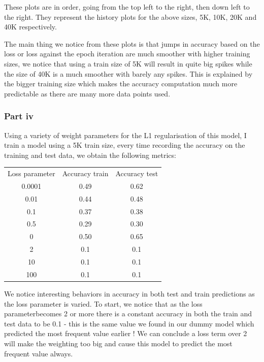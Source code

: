 \documentclass[10pt]{article}
\begin{document}
These plots are in order, going from the top left to the right, then down left to the right.
They represent the history plots for the above sizes, 5K, 10K, 20K and 40K respectively.

The main thing we notice from these plots is that jumps in accuracy based on the loss
or loss against the epoch iteration are much smoother with higher training sizes, we notice
that using a train size of 5K will result in quite big spikes while the size of 40K
is a much smoother with barely any spikes. This is explained by the bigger
training size which makes the accuracy computation much more predictable as there are many more data points used. 

\subsubsection*{Part iv}
Using a variety of weight parameters for the L1 regularisation of this model, I train a model using a 5K train size, every time
recording the accuracy on the training and test data, we obtain the following metrics:

\vspace{5mm} %
\begin{center} \begin{tabular}[h]{ccc}
    Loss parameter & Accuracy train & Accuracy test  \\
    0.0001 & 0.49           & 0.62            \\
    0.01   & 0.44           & 0.48            \\
    0.1    & 0.37           & 0.38            \\   
    0.5    & 0.29           & 0.30            \\
    0      & 0.50           & 0.65            \\
    2      & 0.1            & 0.1             \\
    10     & 0.1            & 0.1             \\
    100    & 0.1            & 0.1             \\
\end{tabular} \end{center}

We notice interesting behaviors in accuracy in both test and train predictions
as the loss parameter is varied.
To start, we notice that as the loss parameterbecomes 2 or more there is a constant
accuracy in both the train and test data to be 0.1 - this is the same value we found in our
dummy model which predicted the most frequent value earlier ! We can conclude a loss term over
2 will make the weighting too big and cause this model to predict the most frequent value always.
\end{document}
